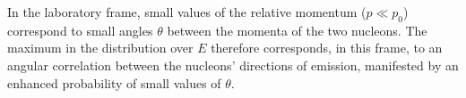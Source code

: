 In the laboratory frame, small values of the relative momentum ($p\ll p_0$) correspond to small angles $\theta$ between the momenta of the two nucleons. The maximum in the distribution over $E$ therefore corresponds, in this frame, to an angular correlation between the nucleons' directions of emission, manifested by an enhanced probability of small values of $\theta$.
